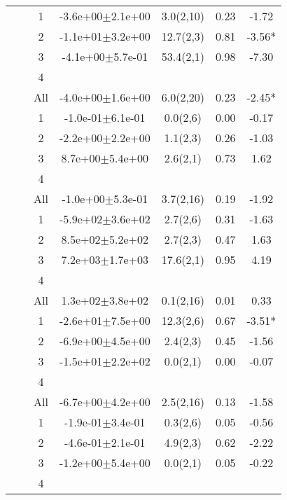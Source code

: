 \begin{longtable}{llccccS[table-format=-2.2, table-space-text-post = {***}]}
{} & {} & 1 & -3.6e+00$\pm$2.1e+00 & 3.0(2,10) & 0.23 & -1.72 \\ 
   &  & 2 & -1.1e+01$\pm$3.2e+00 & 12.7(2,3) & 0.81 & -3.56* \\ 
   &  & 3 & -4.1e+00$\pm$5.7e-01 & 53.4(2,1) & 0.98 & -7.30 \\ 
   &  & 4 &  &  &  &  \\ 
   &  & All & -4.0e+00$\pm$1.6e+00 & 6.0(2,20) & 0.23 & -2.45* \\ 
   \midrule
{} & {} & 1 & -1.0e-01$\pm$6.1e-01 & 0.0(2,6) & 0.00 & -0.17 \\ 
   &  & 2 & -2.2e+00$\pm$2.2e+00 & 1.1(2,3) & 0.26 & -1.03 \\ 
   &  & 3 &  8.7e+00$\pm$5.4e+00 & 2.6(2,1) & 0.73 & 1.62 \\ 
   &  & 4 &  &  &  &  \\ 
   &  & All & -1.0e+00$\pm$5.3e-01 & 3.7(2,16) & 0.19 & -1.92 \\ 
   \midrule
{} & {} & 1 & -5.9e+02$\pm$3.6e+02 & 2.7(2,6) & 0.31 & -1.63 \\ 
   &  & 2 &  8.5e+02$\pm$5.2e+02 & 2.7(2,3) & 0.47 & 1.63 \\ 
   &  & 3 &  7.2e+03$\pm$1.7e+03 & 17.6(2,1) & 0.95 & 4.19 \\ 
   &  & 4 &  &  &  &  \\ 
   &  & All &  1.3e+02$\pm$3.8e+02 & 0.1(2,16) & 0.01 & 0.33 \\ 
   \midrule
{} & {} & 1 & -2.6e+01$\pm$7.5e+00 & 12.3(2,6) & 0.67 & -3.51* \\ 
   &  & 2 & -6.9e+00$\pm$4.5e+00 & 2.4(2,3) & 0.45 & -1.56 \\ 
   &  & 3 & -1.5e+01$\pm$2.2e+02 & 0.0(2,1) & 0.00 & -0.07 \\ 
   &  & 4 &  &  &  &  \\ 
   &  & All & -6.7e+00$\pm$4.2e+00 & 2.5(2,16) & 0.13 & -1.58 \\ 
   \midrule
{} & {} & 1 & -1.9e-01$\pm$3.4e-01 & 0.3(2,6) & 0.05 & -0.56 \\ 
   &  & 2 & -4.6e-01$\pm$2.1e-01 & 4.9(2,3) & 0.62 & -2.22 \\ 
   &  & 3 & -1.2e+00$\pm$5.4e+00 & 0.0(2,1) & 0.05 & -0.22 \\ 
   &  & 4 &  &  &  &  \\ 

\end{longtable}
